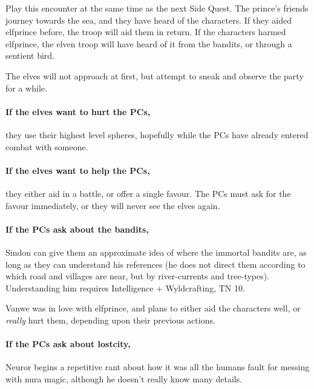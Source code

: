 \begin{multicols}{2}
Play this encounter at the same time as the next Side Quest.
The prince's friends journey towards the sea, and they have heard of the characters.
If they aided \gls{elfprince} before, the troop will aid them in return.
If the characters harmed \gls{elfprince}, the elven troop will have heard of it from the bandits, or through a sentient bird.

The elves will not approach at first, but attempt to sneak and observe the party for a while.

\paragraph{If the elves want to hurt the PCs,}
they use their highest level spheres, hopefully while the PCs have already entered combat with someone.

\paragraph{If the elves want to help the PCs,}
they either aid in a battle, or offer a single favour.
The PCs must ask for the favour immediately, or they will never see the elves again.


\paragraph{If the PCs ask about the bandits,}
Sindon can give them an approximate idea of where the immortal bandits are, as long as they can understand his references (he does not direct them according to which road and villages are near, but by river-currents and tree-types).
Understanding him requires Intelligence + Wyldcrafting, TN 10.


Vanwe was in love with \gls{elfprince}, and plans to either aid the characters well, or \emph{really} hurt them, depending upon their previous actions.

\label{neuror}

\paragraph{If the PCs ask about \gls{lostcity},}
Neuror begins a repetitive rant about how it was all the humans fault for messing with nura magic, although he doesn't really know many details.


\end{multicols}
